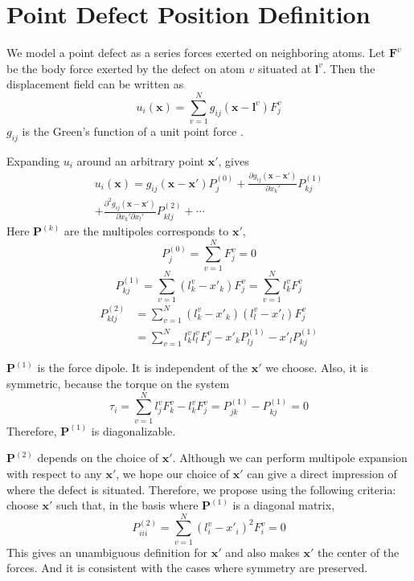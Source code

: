 \documentclass[%
 reprint,
 amsmath,amssymb,
 aps,
]{revtex4-1}
\begin{document}
\appendix
\section{Point Defect Position Definition}
\label{app:position}
We model a point defect as a series forces exerted on neighboring atoms.
Let $\bm{F}^{v}$ be the body force exerted by the defect on atom $v$ situated at $\bm{l}^v$.
Then the displacement field can be written as
\begin{equation}
u_i(\bm{x}) = \sum_{v=1}^{N} g_{ij}(\bm{x}-\bm{l}^v) F_j^v
\end{equation}
$g_{ij}$ is the Green's function of a unit point force \cite{seifmultipolar,ting1997three}.

Expanding $u_i$ around an arbitrary point $\bm{x'}$, gives
\begin{multline}
u_i(\bm{x})
= g_{ij}(\bm{x}-\bm{x'}) P_j^{(0)}
 + \frac{\partial g_{ij}(\bm{x}-\bm{x'})}{\partial x_k'} P_{kj}^{(1)}\\
 + \frac{\partial^2 g_{ij}(\bm{x}-\bm{x'})}{\partial x_k' \partial x_l'} P_{klj}^{(2)}
 + \cdots
\end{multline}
Here $\bm{P}^{(k)}$ are the multipoles corresponds to $\bm{x'}$,
\begin{equation}
  P_j^{(0)} = \sum_{v=1}^N F_j^v = 0
\end{equation}
\begin{equation}
  P_{kj}^{(1)} = \sum_{v=1}^N (l_k^v-x'_k) F_j^v = \sum_{v=1}^N l_k^v F_j^v
\end{equation}
\begin{align}
  P_{klj}^{(2)} & = \sum_{v=1}^N (l_k^v-x'_k) (l_l^v-x'_l) F_j^v \nonumber \\
  & = \sum_{v=1}^N l_k^vl_l^v F_j^v - x'_k P_{lj}^{(1)} - x'_l P_{kj}^{(1)}
\end{align}

$\bm{P}^{(1)}$ is the force dipole.
It is independent of the $\bm{x'}$ we choose.
Also, it is symmetric, because the torque on the system
\begin{equation}
  \tau_i = \sum_{v=1}^N l_j^v F_k^v - l_k^v F_j^v = P_{jk}^{(1)} - P_{kj}^{(1)} = 0
\end{equation}
Therefore, $\bm{P}^{(1)}$ is diagonalizable.

$\bm{P}^{(2)}$ depends on the choice of $\bm{x'}$.
Although we can perform multipole expansion with respect to any $\bm{x'}$, we hope our choice of $\bm{x'}$ can give a direct impression of where the defect is situated.
Therefore, we propose using the following criteria:
choose $\bm{x'}$ such that, in the basis where $\bm{P}^{(1)}$ is a diagonal matrix,
\begin{equation}
  P_{iii}^{(2)} = \sum_{v=1}^N (l_i^v-x'_i)^2 F_i^v = 0
\end{equation}
This gives an unambiguous definition for $\bm{x'}$ and also makes $\bm{x'}$ the center of the forces.
And it is consistent with the cases where symmetry are preserved.
\end{document}
